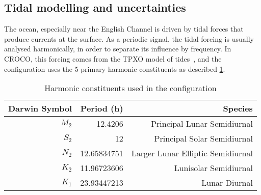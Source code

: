 \documentclass[../../Main_ManuscritThese.tex]{subfiles}
\newcommand{\CROCO}{CROCO}
\begin{document}
\subsection{Tidal modelling and uncertainties}
\label{ssec:tidal_modelling}
The ocean, especially near the English Channel is driven by tidal
forces that produce currents at the surface. As a periodic signal, the
tidal forcing is usually analysed harmonically, in order to separate
its influence by frequency. In \CROCO, this forcing comes from the
TPXO model of tides~\citep{egbert_efficient_2002}, and the
configuration uses the 5 primary harmonic constituents as described
\cref{tab:tides_components}.
\begin{table}[!h]
  \centering
  \begin{tabular}{rrr}\toprule
    Darwin Symbol & Period (h)   & Species                           \\ \midrule
    $M_2$         & 12.4206      & Principal Lunar Semidiurnal       \\
    $S_2$         & 12           & Principal Solar Semidiurnal       \\
    $N_2$         & 12.65834751  & Larger Lunar Elliptic Semidiurnal \\
    $K_2$         & 11.96723606  & Lunisolar Semidiurnal             \\
    $K_1$         & 23.93447213  & Lunar Diurnal                     \\
    \bottomrule
  \end{tabular}
  \caption{Harmonic constituents used in the configuration}
  \label{tab:tides_components}
\end{table}
\end{document}
